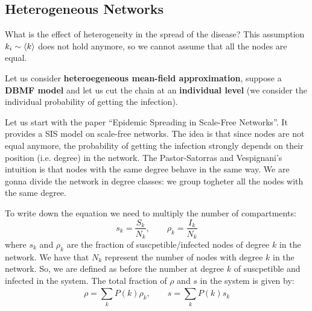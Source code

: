 \documentclass[../main/main.tex]{subfiles}
\begin{document}


\subsection{Heterogeneous Networks}

What is the effect of heterogeneity in the spread of the disease? This assumption \( k_i \sim \expval{k}  \) does not hold anymore, so we cannot assume that all the nodes are equal.

Let us consider \textbf{heteroegeneous mean-field approximation}, suppose a \textbf{ DBMF model} and let us cut the chain at an \textbf{individual level} (we consider the individual probability of getting the infection).

Let us start with the paper “Epidemic Spreading in Scale-Free Networks”. It provides a SIS model on scale-free networks.
The idea is that since nodes are not equal anymore, the probability of getting the infection strongly depends on their position (i.e. degree) in the network. The Pastor-Satorras and Vespignani's intuition is that nodes with the same degree behave in the same way.
We are gonna divide the network in degree classes: we group togheter all the nodes with the same degree.

To write down the equation we need to multiply the number of compartments:
\begin{equation*}
  s_k = \frac{S_k}{N_k}, \qquad \rho _k = \frac{I_k}{N_k}
\end{equation*}
where \( s_k \) and \( \rho _k \) are the fraction of suscpetible/infected nodes of degree \( k \) in the network. We have that \( N_k \) represent the number of nodes with degree \( k \) in the network. So, we are defined as before the number at degree \( k \) of suscpetible and infected in the system.
The total fraction of \( \rho  \) and \( s \) in the system is given by:
\begin{equation}
  \rho = \sum_{k}^{} P(k) \rho _k, \qquad s = \sum_{k}^{} P(k) s_k
\end{equation}
\end{document}
